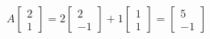 \documentclass[preview]{standalone}
\begin{document}
\begin{align*}
A\begin{bmatrix} 2 \\ 1 \end{bmatrix} =  2\begin{bmatrix} 2 \\ -1 \end{bmatrix} +  1\begin{bmatrix} 1 \\ 1 \end{bmatrix} =  \begin{bmatrix} 5 \\ -1 \end{bmatrix}
\end{align*}
\end{document}
